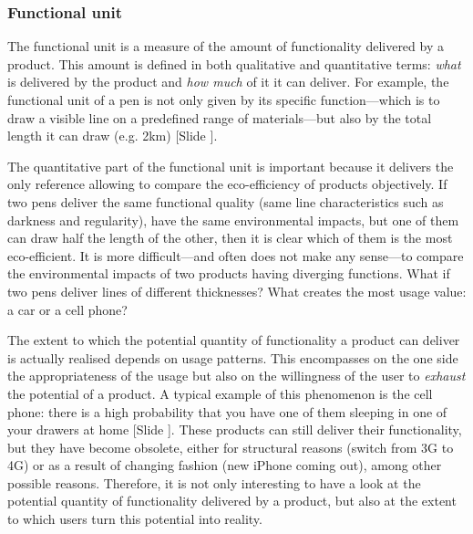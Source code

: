 \documentclass{article}
\newcounter{slide}
\begin{document}
\subsubsection{Functional unit}
\label{sec:fu}
The functional unit is a measure of the amount of functionality delivered by a product. This amount is defined in both qualitative and quantitative terms: \emph{what} is delivered by the product and \emph{how much} of it it can deliver. For example, the functional unit of a pen is not only given by its specific function---which is to draw a visible line on a predefined range of materials---but also by the total length it can draw (e.g. 2km) {\color{blue}[Slide ]}. 

The quantitative part of the functional unit is important because it delivers the only reference allowing to compare the eco-efficiency of products objectively. If two pens deliver the same functional quality (same line characteristics such as darkness and regularity), have the same environmental impacts, but one of them can draw half the length of the other, then it is clear which of them is the most eco-efficient. It is more difficult---and often does not make any sense---to compare the environmental impacts of two products having diverging functions. What if two pens deliver lines of different thicknesses? What creates the most usage value: a car or a cell phone?

The extent to which the potential quantity of functionality a product can deliver is actually realised depends on usage patterns. This encompasses on the one side the appropriateness of the usage but also on the willingness of the user to \emph{exhaust} the potential of a product. A typical example of this phenomenon is the cell phone: there is a high probability that you have one of them sleeping in one of your drawers at home \cite{hanson2014s} {\color{blue}[Slide ]}. These products can still deliver their functionality, but they have become obsolete, either for structural reasons (switch from 3G to 4G) or as a result of changing fashion (new iPhone coming out), among other possible reasons. Therefore, it is not only interesting to have a look at the potential quantity of functionality delivered by a product, but also at the extent to which users turn this potential into reality. 
\end{document}
